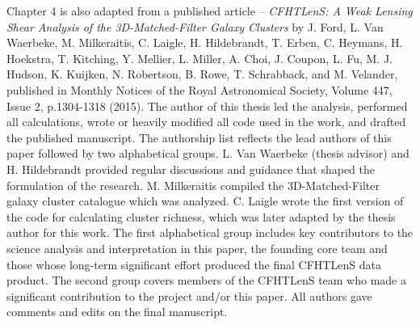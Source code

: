Chapter 4 is also adapted from a published article -- {\it CFHTLenS: A Weak Lensing Shear Analysis of the 3D-Matched-Filter Galaxy Clusters} by J. Ford, L. Van Waerbeke, M. Milkeraitis, C. Laigle, H. Hildebrandt, T. Erben, C. Heymans, H. Hoekstra, T. Kitching, Y. Mellier, L. Miller, A. Choi, J. Coupon, L. Fu, M. J. Hudson, K. Kuijken, N. Robertson, B. Rowe, T. Schrabback, and M. Velander, published in Monthly Notices of the Royal Astronomical Society, Volume 447, Issue 2, p.1304-1318 (2015). The author of this thesis led the analysis, performed all calculations, wrote or heavily modified all code used in the work, and drafted the published manuscript. The authorship list reflects the lead authors of this paper followed by two alphabetical groups. L. Van Waerbeke (thesis advisor) and H. Hildebrandt provided regular discussions and guidance that shaped the formulation of the research. M. Milkeraitis compiled the 3D-Matched-Filter galaxy cluster catalogue which was analyzed. C. Laigle wrote the first version of the code for calculating cluster richness, which was later adapted by the thesis author for this work. The first alphabetical group includes key contributors to the science analysis and interpretation in this paper, the founding core team and those whose long-term significant effort produced the final CFHTLenS data product. The second group covers members of the CFHTLenS team who made a significant contribution to the project and/or this paper. All authors gave comments and edits on the final manuscript.

